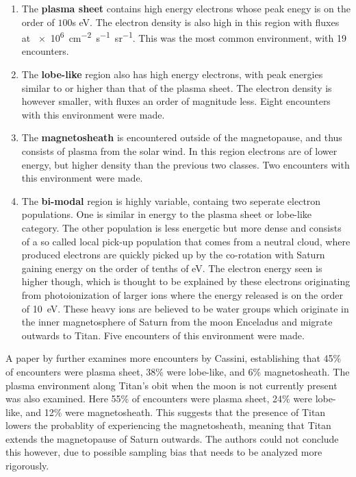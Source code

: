 \documentclass[12pt, parskip=full*, abstract]{scrartcl}
\begin{document}
\begin{enumerate}
	\item The \textbf{plasma sheet} contains high energy electrons whose peak enegy is on the order of $100$s \si{\electronvolt}. The electron density is also high in this region with fluxes at \SI{e6}{\centi\metre^{-2}\second^{-1}\steradian^{-1}}. This was the most common environment, with 19 encounters.
	\item The \textbf{lobe-like} region also has high energy electrons, with peak energies similar to or higher than that of the plasma sheet. The electron density is however smaller, with fluxes an order of magnitude less. Eight encounters with this environment were made.
	\item The \textbf{magnetosheath} is encountered outside of the magnetopause, and thus consists of plasma from the solar wind. In this region electrons are of lower energy, but higher density than the previous two classes. Two encounters with this environment were made.
	\item The \textbf{bi-modal} region is highly variable, containg two seperate electron populations. One is similar in energy to the plasma sheet or lobe-like category. The other population is less energetic but more dense and consists of a so called local pick-up population that comes from a neutral cloud, where produced electrons are quickly picked up by the co-rotation with Saturn gaining energy on the order of tenths of \si{\electronvolt}. The electron energy seen is higher though, which is thought to be explained by these electrons originating from photoionization of larger ions where the energy released is on the order of \SI{10}{\electronvolt}. These heavy ions are believed to be water groups which originate in the inner magnetosphere of Saturn from the moon Enceladus and migrate outwards to Titan. Five encounters of this environment were made.

\end{enumerate}

A paper by \textcite{Smith-WithOrWithoutTitan} further examines more encounters by Cassini, establishing that 45\% of encounters were plasma sheet, 38\% were lobe-like, and 6\% magnetosheath. The plasma environment along Titan's obit when the moon is not currently present was also examined. Here 55\% of encounters were plasma sheet, 24\% were lobe-like, and 12\% were magnetosheath. This suggests that the presence of Titan lowers the probablity of experiencing the magnetosheath, meaning that Titan extends the magnetopause of Saturn outwards. The authors could not conclude this however, due to possible sampling bias that needs to be analyzed more rigorously. 
\end{document}
